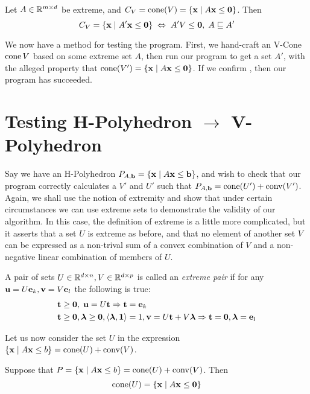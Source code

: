 \begin{EqCriteria}\label{eq_vc_hc}
	Let $A\in\mathbb{R}^{m\times d}$ be extreme, and $C_V = \operatorname{cone}(V) = \left\{\mathbf{x}\;|\; A\mathbf{x}\leq\mathbf{0}\right\}$.  Then
	\[ C_V = \left\{\mathbf{x}\;|\; A'\mathbf{x}\leq\mathbf{0}\right\} \;\Leftrightarrow\; A'V\leq\mathbf{0},\; A \sqsubseteq A' \]
\end{EqCriteria}

\begin{Test}\label{test_vc_to_hc}
	We now have a method for testing the program.  First, we hand-craft an V-Cone $\operatorname{cone}{V}$ based on some extreme set $A$, then run our program to get a set $A'$, with the alleged property that $\operatorname{cone}(V') = \left\{\mathbf{x}\;|\; A\mathbf{x}\leq\mathbf{0}\right\}$.  If we confirm , then our program has succeeded.
\end{Test}

\section{Testing H-Polyhedron $\to$ V-Polyhedron}

Say we have an H-Polyhedron $P_{A,\mathbf{b}} = \left\{\mathbf{x}\;|\; A\mathbf{x}\leq \mathbf{b}\right\}$, and wish to check that our program correctly calculates a $V'$ and $U'$ such that $P_{A,\mathbf{b}} = \operatorname{cone}(U') + \operatorname{conv}(V')$.  Again, we shall use the notion of extremity and show that under certain circumstances we can use extreme sets to demonstrate the validity of our algorithm.  In this case, the definition of extreme is a little more complicated, but it asserts that a set $U$ is extreme as before, and that no element of another set $V$ can be expressed as a non-trival sum of a convex combination of $V$ and a non-negative linear combination of members of $U$.

\begin{Def}{ A pair of sets $U\in\mathbb{R}^{d\times n}, V\in\mathbb{R}^{d\times p}$ is called an \textit{extreme pair} if for any $\mathbf{u} = U\mathbf{e}_k, \mathbf{v} = V\mathbf{e}_l$ the following is true:
		\begin{alignat*}{1}
			 & \mathbf{t} \geq \mathbf{0},\; \mathbf{u} = U\mathbf{t} \Rightarrow \mathbf{t} = \mathbf{e}_k                              \\
			 & \mathbf{t} \geq \mathbf{0}, \bm{\lambda} \geq \mathbf{0}, \left\langle \bm{\lambda}, \mathbf{1} \right\rangle = 1, \mathbf{v} = U\mathbf{t} + V\bm{\lambda}
			\Rightarrow \mathbf{t} = \mathbf{0}, \bm{\lambda} = \mathbf{e}_l
		\end{alignat*}
	}\end{Def}

Let us now consider the set $U$ in the expression $\left\{\mathbf{x}\;|\; A\mathbf{x}\leq b\right\} = \operatorname{cone}(U) + \operatorname{conv}(V)$.

\begin{Prop}\label{characteristic_cone}
	Suppose that $P = \left\{\mathbf{x}\;|\; A\mathbf{x}\leq b\right\} = \operatorname{cone}(U) + \operatorname{conv}(V)$.  Then
	\[ \operatorname{cone}(U) = \left\{\mathbf{x}\;|\; A\mathbf{x}\leq\mathbf{0}\right\} \]
\end{Prop}

